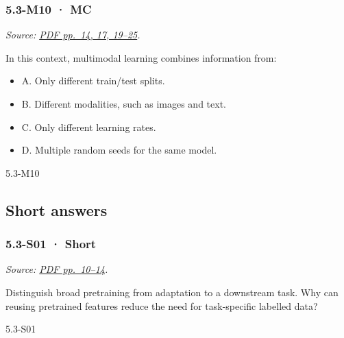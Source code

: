 \noindent\begin{minipage}{\linewidth}

\subsubsection{5.3-M10 · MC}\label{m10-mc-14}

\emph{Source:
\href{../Lecture\%20Slides/5.3.\%20Foundation\%20models.pdf\#page=14}{PDF
pp.~14, 17, 19--25}.}

In this context, multimodal learning combines information from:

\begin{itemize}
\tightlist
\item
  A. Only different train/test splits.
\item
  B. Different modalities, such as images and text.
\item
  C. Only different learning rates.
\item
  D. Multiple random seeds for the same model.
\end{itemize}

\begin{solution}[8mm]{5.3-M10}

\end{solution}
\end{minipage}\par\medskip

\subsection{Short answers}\label{short-answers-15}

\noindent\begin{minipage}{\linewidth}

\subsubsection{5.3-S01 · Short}\label{s01-short-14}

\emph{Source:
\href{../Lecture\%20Slides/5.3.\%20Foundation\%20models.pdf\#page=10}{PDF
pp.~10--14}.}

Distinguish broad pretraining from adaptation to a downstream task. Why
can reusing pretrained features reduce the need for task-specific
labelled data?

\begin{solution}[20mm]{5.3-S01}

\end{solution}
\end{minipage}\par\medskip


